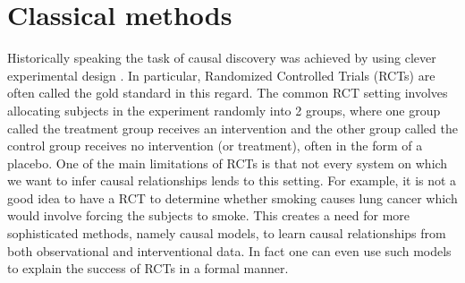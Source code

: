 \documentclass{tufte-book}
\begin{document}
\section{Classical methods}
\label{sec:org883420e}
Historically speaking the task of causal discovery was achieved by using clever experimental design \cite{fisher-1935}. In particular, Randomized Controlled Trials (RCTs) are often called the gold standard in this regard. The common RCT setting involves allocating subjects in the experiment randomly into 2 groups, where one group called the treatment group receives an intervention and the other group called the control group receives no intervention (or treatment), often in the form of a placebo. One of the main limitations of RCTs is that not every system on which we want to infer causal relationships lends to this setting. For example, it is not a good idea to have a RCT to determine whether smoking causes lung cancer which would involve forcing the subjects to smoke. This creates a need for more sophisticated methods, namely causal models, to learn causal relationships from both observational and interventional data. In fact one can even use such models to explain the success of RCTs in a formal manner.
\end{document}
